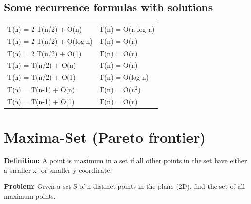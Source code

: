 \documentclass[12pt]{article}
\newcommand{\1}{\space \quad}
\newcommand{\2}{\quad \quad \quad}
\newcommand{\3}{\quad \quad \quad \quad \space}
\newcommand{\4}{\quad \quad \quad \quad \quad \quad}
\newcommand{\5}{\quad \quad \quad \quad \quad \quad \quad \space}
\begin{document}
\subsection{Some recurrence formulas with solutions}
\begin{tabular}{|l|l|}
  \hline
  \rowcolor{myBlue}
  \color{white}{\textbf{Recurrence}} \hspace{165pt} & \color{white}{\textbf{Solution}} \hspace{165pt} \\
  \hline
  T(n) = 2 T(n/2) + O(n) & T(n) = O(n log n) \\
  \hline
  T(n) = 2 T(n/2) + O(log n) & T(n) = O(n) \\
  \hline
  T(n) = 2 T(n/2) + O(1) & T(n) = O(n) \\
  \hline
  T(n) = T(n/2) + O(n) & T(n) = O(n) \\
  \hline
  T(n) = T(n/2) + O(1) & T(n) = O(log n) \\
  \hline
  T(n) = T(n-1) + O(n) & T(n) = O($n^2$) \\
  \hline
  T(n) = T(n-1) + O(1) & T(n) = O(n) \\
  \hline
\end{tabular}

\section{Maxima-Set (Pareto frontier)}
\textbf{Definition:} A point is maximum in a set if all other points in the set have either a smaller x- or smaller 
y-coordinate. 

\textbf{Problem:} Given a set S of n distinct points in the plane (2D), find
the set of all maximum points.
\end{document}
